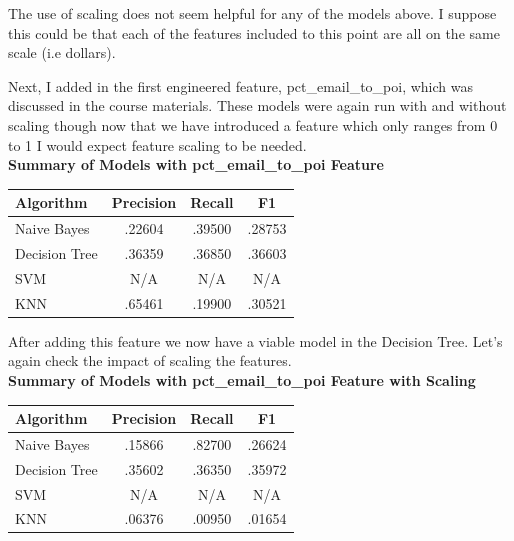 \documentclass[a4paper,11pt]{report}
\begin{document}
The use of scaling does not seem helpful for any of the models above.  I suppose
this could be that each of the features included to this point are all on the
same scale (i.e dollars).

Next, I added in the first engineered feature, pct\_email\_to\_poi, which was discussed in the course
materials.  These models were again run with and without scaling though now that
we have introduced a feature which only ranges from 0 to 1 I would expect
feature scaling to be needed. \\

\textbf{Summary of Models with pct\_email\_to\_poi Feature} \\
\begin{center}
    \begin{tabular}{|| l c c c ||}
        \hline Algorithm & Precision & Recall & F1 \\
        \hline\hline
        Naive Bayes & .22604 & .39500 & .28753 \\
        \hline
        Decision Tree & .36359 & .36850 & .36603 \\
        \hline
        SVM & N/A & N/A & N/A \\
        \hline
        KNN & .65461 & .19900 & .30521  \\
        \hline
    \end{tabular}
\end{center}

After adding this feature we now have a viable model in the Decision Tree.
Let's again check the impact of scaling the features. \\

\textbf{Summary of Models with pct\_email\_to\_poi Feature with Scaling} \\
\begin{center}
    \begin{tabular}{|| l c c c ||}
        \hline Algorithm & Precision & Recall & F1 \\
        \hline\hline
        Naive Bayes & .15866 & .82700 & .26624 \\
        \hline
        Decision Tree & .35602 & .36350 & .35972 \\
        \hline
        SVM & N/A & N/A & N/A \\
        \hline
        KNN & .06376 & .00950 & .01654  \\
        \hline
    \end{tabular}
\end{center}
\end{document}
